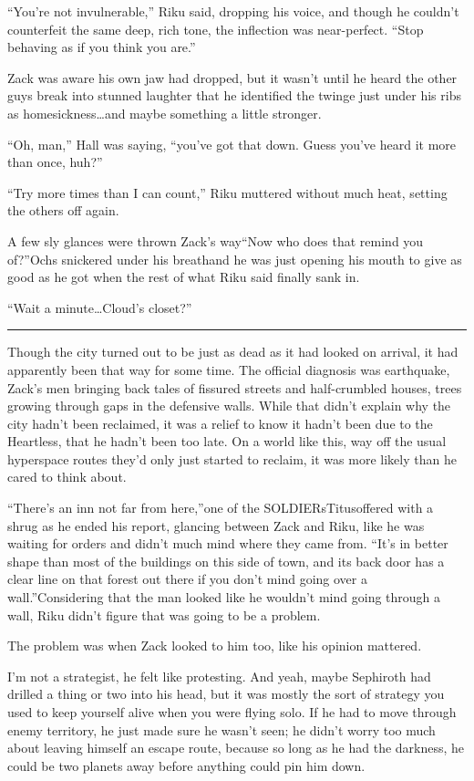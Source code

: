 ``You're not invulnerable,'' Riku said, dropping his voice, and though he couldn't counterfeit the same deep, rich tone, the inflection was near-perfect. ``Stop behaving as if you think you are.''

Zack was aware his own jaw had dropped, but it wasn't until he heard the other guys break into stunned laughter that he identified the twinge just under his ribs as homesickness\ldots and maybe something a little stronger.

``Oh, man,'' Hall was saying, ``you've got that down. Guess you've heard it more than once, huh?''

``Try more times than I can count,'' Riku muttered without much heat, setting the others off again.

A few sly glances were thrown Zack's way\textemdash ``Now who does that remind you of?''Ochs snickered under his breath\textemdash and he was just opening his mouth to give as good as he got when the rest of what Riku said finally sank in.

``Wait a minute\ldots Cloud's closet?''

\fancybreak{\pfbreakdisplay}


Though the city turned out to be just as dead as it had looked on arrival, it had apparently been that way for some time. The official diagnosis was earthquake, Zack's men bringing back tales of fissured streets and half-crumbled houses, trees growing through gaps in the defensive walls. While that didn't explain why the city hadn't been reclaimed, it was a relief to know it hadn't been due to the Heartless, that he hadn't been too late. On a world like this, way off the usual hyperspace routes they'd only just started to reclaim, it was more likely than he cared to think about.

``There's an inn not far from here,''one of the SOLDIERs\textemdash Titus\textemdash offered with a shrug as he ended his report, glancing between Zack and Riku, like he was waiting for orders and didn't much mind where they came from. ``It's in better shape than most of the buildings on this side of town, and its back door has a clear line on that forest out there if you don't mind going over a wall.''Considering that the man looked like he wouldn't mind going through a wall, Riku didn't figure that was going to be a problem.

The problem was when Zack looked to him too, like his opinion mattered.

I'm not a strategist, he felt like protesting. And yeah, maybe Sephiroth had drilled a thing or two into his head, but it was mostly the sort of strategy you used to keep yourself alive when you were flying solo. If he had to move through enemy territory, he just made sure he wasn't seen; he didn't worry too much about leaving himself an escape route, because so long as he had the darkness, he could be two planets away before anything could pin him down.

